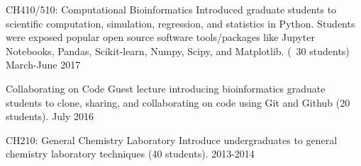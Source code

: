 
\begin{cvteaching}


    \cvteach
        {CH410/510: Computational Bioinformatics}
        {Introduced graduate students to scientific computation, simulation, regression, and statistics in Python. Students were exposed popular open source software tools/packages like Jupyter Notebooks, Pandas, Scikit-learn, Numpy, Scipy, and Matplotlib. (~30 students)}
        {March-June 2017}

    \cvteach
        {Collaborating on Code}
        {Guest lecture introducing bioinformatics graduate students to clone, sharing, and collaborating on code using Git and Github (20 students).}
        {July 2016}

    \cvteach
        {CH210: General Chemistry Laboratory}
        {Introduce undergraduates to general chemistry laboratory techniques (40 students).}
        {2013-2014}

\end{cvteaching}
